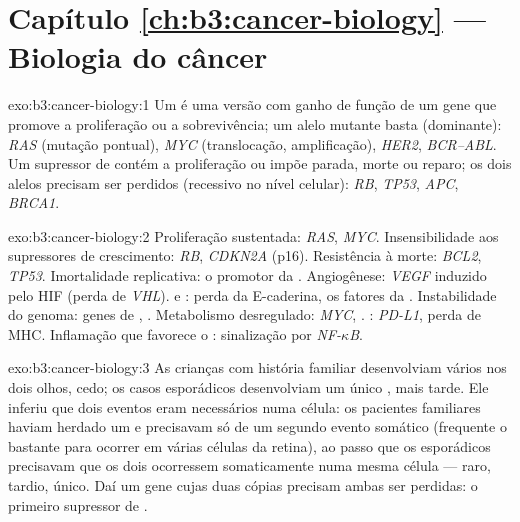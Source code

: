 \section*{Capítulo \ref{ch:b3:cancer-biology} --- Biologia do câncer}

\begin{solution}{exo:b3:cancer-biology:1}
Um  é uma versão com ganho de função de um gene que promove a
proliferação ou a sobrevivência; um alelo mutante basta (dominante):
\emph{RAS} (mutação pontual), \emph{MYC} (translocação, amplificação),
\emph{HER2}, \emph{BCR--ABL}. Um supressor de  contém a
proliferação ou impõe parada, morte ou reparo; os dois alelos precisam
ser perdidos (recessivo no nível celular): \emph{RB}, \emph{TP53},
\emph{APC}, \emph{BRCA1}.
\end{solution}

\begin{solution}{exo:b3:cancer-biology:2}
Proliferação sustentada: \emph{RAS}, \emph{MYC}. Insensibilidade aos
supressores de crescimento: \emph{RB}, \emph{CDKN2A} (p16). Resistência
à morte: \emph{BCL2}, \emph{TP53}. Imortalidade replicativa: o promotor
da . Angiogênese: \emph{VEGF} induzido pelo HIF (perda de
\emph{VHL}).  e : perda da E-caderina, os fatores da
. Instabilidade do genoma: genes de
, \emph{}. Metabolismo desregulado:
\emph{MYC}, . : \emph{PD-L1}, perda de MHC.
Inflamação que favorece o : sinalização por
\emph{NF-$\kappa$B}.
\end{solution}

\begin{solution}{exo:b3:cancer-biology:3}
As crianças com história familiar desenvolviam vários  nos dois
olhos, cedo; os casos esporádicos desenvolviam um único , mais
tarde. Ele inferiu que dois eventos eram necessários numa célula: os
pacientes familiares haviam herdado um e precisavam só de um segundo
evento somático (frequente o bastante para ocorrer em várias células da
retina), ao passo que os esporádicos precisavam que os dois ocorressem
somaticamente numa mesma célula --- raro, tardio, único. Daí um gene
cujas duas cópias precisam ambas ser perdidas: o primeiro supressor de
.
\end{solution}

